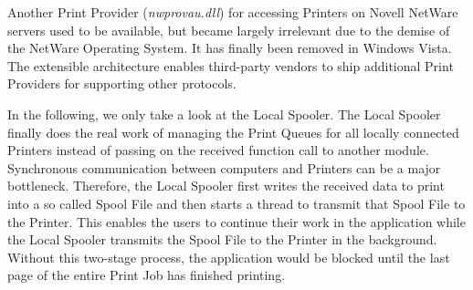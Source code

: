 Another Print Provider (\emph{nwprovau.dll}) for accessing Printers on Novell NetWare servers used to be available, but became largely irrelevant due to the demise of the NetWare Operating System.
It has finally been removed in Windows Vista.
The extensible architecture enables third-party vendors to ship additional Print Providers for supporting other protocols.

In the following, we only take a look at the Local Spooler.
The Local Spooler finally does the real work of managing the Print Queues for all locally connected Printers instead of passing on the received function call to another module.
Synchronous communication between computers and Printers can be a major bottleneck.
Therefore, the Local Spooler first writes the received data to print into a so called Spool File and then starts a thread to transmit that Spool File to the Printer.
This enables the users to continue their work in the application while the Local Spooler transmits the Spool File to the Printer in the background.
Without this two-stage process, the application would be blocked until the last page of the entire Print Job has finished printing.

